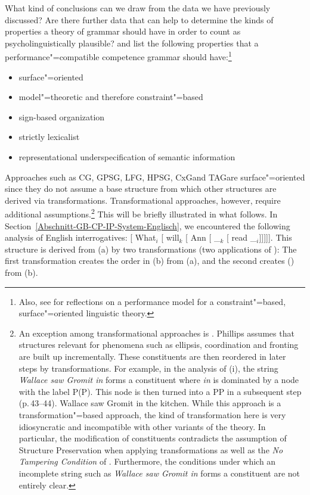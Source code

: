 What kind of conclusions can we draw from the data we have previously discussed? Are there further data that can help to determine the kinds
of properties a theory of grammar should have in order to count as psycholinguistically plausible? \citet*{SWB2003a} and \citet{SW2011a,SW2015a}
list the following properties that a performance"=compatible competence grammar should have:\footnote{%
  Also, see  for reflections on a performance model for a constraint"=based, surface"=oriented linguistic
  theory.
}
\begin{itemize}
\item surface"=oriented
\item model"=theoretic and therefore constraint"=based
\item sign-based organization
\item strictly lexicalist
\item representational underspecification of semantic information
\end{itemize}

\noindent
Approaches such as CG\indexcg, GPSG\indexgpsg, LFG\indexlfg, HPSG\indexhpsg, CxG\indexcxg and TAG\indextag are surface"=oriented
since they do not assume a base structure from which other structures are derived via transformations. Transformational
approaches, however, require additional assumptions.\footnote{%
	An exception among transformational approaches is . Phillips assumes that structures relevant for phenomena such as ellipsis,
	coordination and fronting
	are built up incrementally. These constituents are then reordered in later steps by transformations. For example, in the analysis of (i), the string
	\emph{Wallace saw Gromit in} forms a constituent where \emph{in} is dominated by a node with the label P(P). This node is then turned into a PP
	in a subsequent step (p.\,43--44).
\ea
Wallace saw Gromit in the kitchen.
\z
While this approach is a transformation"=based approach, the kind of transformation here is very idiosyncratic and incompatible with other
variants of the theory. In particular, the modification of constituents contradicts the assumption of Structure Preservation
when applying transformations as well as the \emph{No Tampering Condition} of \citet{Chomsky2008a}. 
Furthermore, the conditions under which an incomplete string such as \emph{Wallace saw Gromit in} forms a constituent are not
entirely clear.
%
} 
This will be briefly illustrated in what follows.
In Section~\ref{Abschnitt-GB-CP-IP-System-Englisch}, we encountered the following analysis of English interrogatives:
\ea
{}[ What$_i$ [ will$_k$ [ Ann [ \_$_k$ [ read \_$_i$]]]]].
\z
This structure is derived from (a) by two transformations (two applications of \movea):
\eal
{}
\zl
The first transformation creates the order in (b) from (a), and the second creates () from 
(b).

